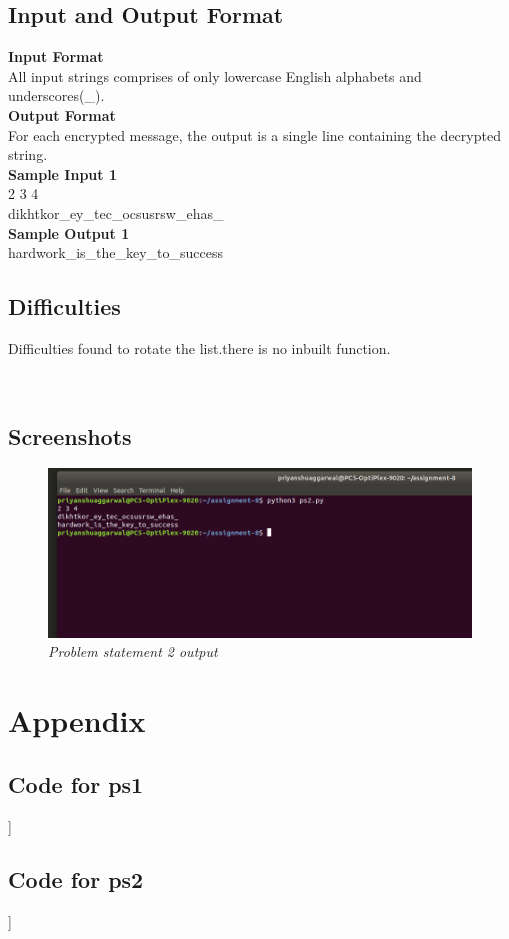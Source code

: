\documentclass[a4paper,12pt]{article}
\begin{document}
  
     \subsection{Input and Output Format}
     \textbf{Input Format}\\
     All input strings comprises of only lowercase English alphabets and underscores(\_).\\
     
 
   
   \textbf{Output Format}\\
   For each encrypted message, the output is a single line containing the decrypted string.\\
   
   \textbf{Sample Input 1}\\
   2 3 4\\
   dikhtkor\_ey\_tec\_ocsusrsw\_ehas\_
   \\
   
   \textbf{Sample Output 1}\\
   hardwork\_is\_the\_key\_to\_success
   
   \newpage

 \subsection{Difficulties}
 Difficulties found to rotate the list.there is no inbuilt function.
 
 \
        \subsection{Screenshots}
       \begin{figure}[h!]     
       	\centering
       	\vspace{-2mm}
		\includegraphics[scale=.45]{ps2}
		\vspace{-7mm}
		\caption{\textit{Problem statement 2 output}}
		\end{figure}
		
  \newpage 


	
		
\section{\large{Appendix}}
\subsection{Code for ps1}
]
\newpage

\subsection{Code for ps2}
]
\newpage

 \nocite{*}



\end{document}
